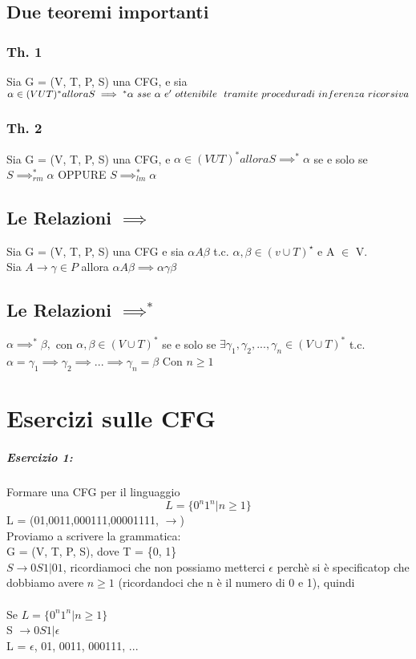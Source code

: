 \documentclass[12pt, a4paper, openany, oneside]{book}
\begin{document}
\section{Due teoremi importanti}
\subsection{Th. 1}
Sia G = (V, T, P, S) una CFG, e sia $\alpha \in (VUT)^{*} allora 
S \implies ^{*}\alpha ~sse~ \alpha ~ e' ~ ottenibile ~ tramite ~ procedura ~
\\ di  ~ inferenza ~ ricorsiva$
\subsection{Th. 2}
Sia G = (V, T, P, S) una CFG, e $\alpha \in (VUT)^{*} allora S \implies ^{*} \alpha$
se e solo se $S \implies_{rm}^{*} \alpha$ OPPURE $S \implies _{lm} ^{*} \alpha$
\section{Le Relazioni $\implies$}
Sia G = (V, T, P, S) una CFG e sia $\alpha A \beta$ t.c. $\alpha , \beta \in
(v\cup T)^{\star}$ e A $\in$ V. \\
Sia $A \to \gamma \in P$ allora $\alpha A \beta \implies \alpha \gamma \beta$
\section{Le Relazioni $\implies^{*}$}
$\alpha \implies^{*} \beta ,$ con $\alpha, \beta \in (V \cup T)^{*}$ se e solo se
$\exists \gamma_{1}, \gamma_{2}, ... , \gamma_{n} \in (V \cup T)^{*}$ t.c.
$\alpha = \gamma_{1} \implies \gamma_{2} \implies ... \implies \gamma_{n} = \beta$
Con $n \geq 1$
\chapter{Esercizi sulle CFG}
\paragraph{Esercizio 1: }Formare una CFG per il linguaggio \\
\[L = \{0^{n} 1^{n} | n \geq 1 \}\]
L = (01,0011,000111,00001111, $\to$)
\\ Proviamo a scrivere la grammatica: \\
G = (V, T, P, S), dove T = \{0, 1\} \\
$S \to 0S1 | 01$, ricordiamoci che non possiamo metterci $\epsilon$ perchè si è
specificatop che dobbiamo avere $n \geq 1$ (ricordandoci che n è il 
numero di 0 e 1), quindi 
\\ \\
Se $L = \{0^{n} 1^{n} | n \geq 1 \}$ \\
S $\to 0S1 | \epsilon$ \\
L = {$\epsilon$, 01, 0011, 000111, ...}
\end{document}
